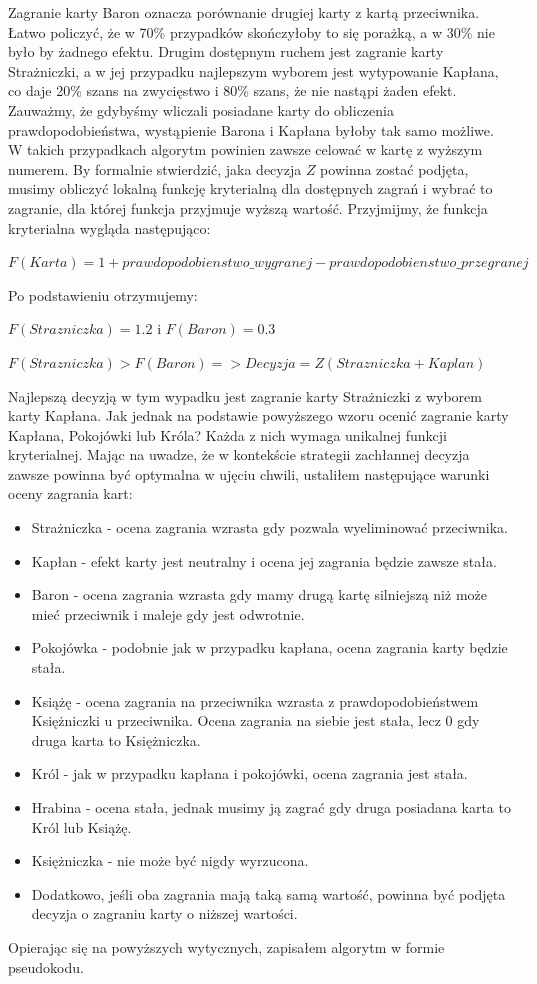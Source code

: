 Zagranie karty Baron oznacza porównanie drugiej karty z kartą przeciwnika. Łatwo policzyć, że w 70\% przypadków skończyłoby to się porażką, a w 30\% nie było by żadnego efektu. Drugim dostępnym ruchem jest zagranie karty Strażniczki, a w jej przypadku najlepszym wyborem jest wytypowanie Kapłana, co daje 20\% szans na zwycięstwo i 80\% szans, że nie nastąpi żaden efekt. Zauważmy, że gdybyśmy wliczali posiadane karty do obliczenia prawdopodobieństwa, wystąpienie Barona i Kapłana byłoby tak samo możliwe. W takich przypadkach algorytm powinien zawsze celować w kartę z wyższym numerem. By formalnie stwierdzić, jaka decyzja $Z$ powinna zostać podjęta, musimy obliczyć lokalną funkcję kryterialną dla dostępnych zagrań i wybrać to zagranie, dla której funkcja przyjmuje wyższą wartość. Przyjmijmy, że funkcja kryterialna wygląda następująco:

\begin{center}
	$F(Karta) = 1 + prawdopodobienstwo\_wygranej - prawdopodobienstwo\_przegranej$
\end{center}
Po podstawieniu otrzymujemy:
\begin{center}
 $F(Strazniczka)=1.2$ i $F(Baron) = 0.3$
 
 $F(Strazniczka)>F(Baron) => Decyzja=Z(Strazniczka + Kaplan)$ 
\end{center} 

Najlepszą decyzją w tym wypadku jest zagranie karty Strażniczki z wyborem karty Kapłana. Jak jednak na podstawie powyższego wzoru ocenić zagranie karty Kapłana, Pokojówki lub Króla? Każda z nich wymaga unikalnej funkcji kryterialnej. Mając na uwadze, że w kontekście strategii zachłannej decyzja zawsze powinna być optymalna w ujęciu chwili, ustaliłem następujące warunki oceny zagrania kart:
\begin{itemize}
	\item Strażniczka - ocena zagrania wzrasta gdy pozwala wyeliminować przeciwnika.
	\item Kapłan - efekt karty jest neutralny i ocena jej zagrania będzie zawsze stała.
	\item Baron - ocena zagrania wzrasta gdy mamy drugą kartę silniejszą niż może mieć przeciwnik i maleje gdy jest odwrotnie.
	\item Pokojówka - podobnie jak w przypadku kapłana, ocena zagrania karty będzie stała.
	\item Książę - ocena zagrania na przeciwnika wzrasta z prawdopodobieństwem Księżniczki u przeciwnika. Ocena zagrania na siebie jest stała, lecz 0 gdy druga karta to Księżniczka.
	\item Król - jak w przypadku kapłana i pokojówki, ocena zagrania jest stała.
	\item Hrabina - ocena stała, jednak musimy ją zagrać gdy druga posiadana karta to Król lub Książę.
	\item Księżniczka - nie może być nigdy wyrzucona.
	\item Dodatkowo, jeśli oba zagrania mają taką samą wartość, powinna być podjęta decyzja o zagraniu karty o niższej wartości.
\end{itemize}
Opierając się na powyższych wytycznych, zapisałem algorytm w formie pseudokodu.
